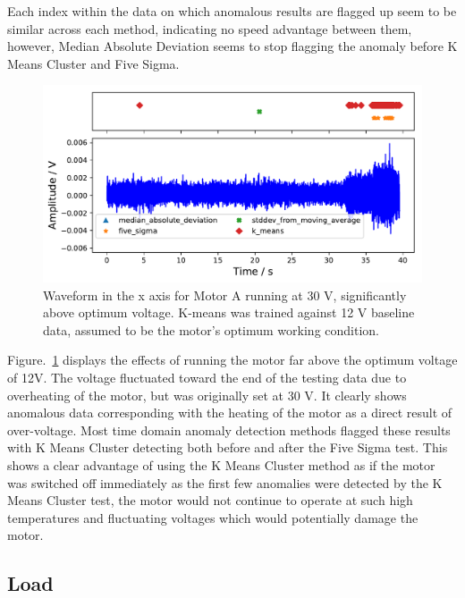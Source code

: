 Each index within the data on which anomalous results are flagged up seem to be similar across each method, indicating no speed advantage between them, however, Median Absolute Deviation seems to stop flagging the anomaly before K Means Cluster and Five Sigma. %

\begin{figure}[t]
    \includegraphics[width=1.0\textwidth]{fig/large_30V_large_12V.pdf}
    \caption[Overvoltage of Large Motor]{Waveform in the x axis for Motor A running at 30 V, significantly above optimum voltage. K-means was trained against 12 V baseline data, assumed to be the motor's optimum working condition.}
    \label{fig:largemotor_30V}
\end{figure}

Figure.~\ref{fig:largemotor_30V} displays the effects of running the motor far above the optimum voltage of 12V. The voltage fluctuated toward the end of the testing data due to overheating of the motor, but was originally set at 30 V. It clearly shows anomalous data corresponding with the heating of the motor as a direct result of over-voltage. Most time domain anomaly detection methods flagged these results with K Means Cluster detecting both before and after the Five Sigma test. This shows a clear advantage of using the K Means Cluster method as if the motor was switched off immediately as the first few anomalies were detected by the K Means Cluster test, the motor would not continue to operate at such high temperatures and fluctuating voltages which would potentially damage the motor.

\subsection{Load}

